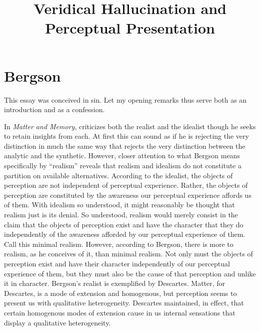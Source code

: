 \documentclass[12pt]{article}
\title{Veridical Hallucination and Perceptual Presentation}
\author{\myauthor}
\date{} %
\begin{document}
\maketitle

\setlength{\parindent}{1em}


\section{Bergson} %
\label{sec:bergson}

This essay was conceived in sin. Let my opening remarks thus serve both as an introduction and as a confession.

In \emph{Matter and Memory}, \citet{Bergson:1912pi} criticizes both the realist and the idealist though he seeks to retain insights from each. At first this can sound as if he is rejecting the very distinction in much the same way that \citet{Quine:1951fk} rejects the very distinction between the analytic and the synthetic. However, closer attention to what Bergson means specifically by ``realism'' reveals that realism and idealism do not constitute a partition on available alternatives. According to the idealist, the objects of perception are not independent of perceptual experience. Rather, the objects of perception are constituted by the awareness our perceptual experience affords us of them. With idealism so understood, it might reasonably be thought that realism just is its denial. So understood, realism would merely consist in the claim that the objects of perception exist and have the character that they do independently of the awareness afforded by our perceptual experience of them. Call this minimal realism. However, according to Bergson, there is more to realism, as he conceives of it, than minimal realism. Not only must the objects of perception exist and have their character independently of our perceptual experience of them, but they must also be the cause of that perception and unlike it in character. Bergson's realist is exemplified by Descartes. Matter, for Descartes, is a mode of extension and homogenous, but perception seems to present us with qualitative heterogeneity. Descartes maintained, in effect, that certain homogenous modes of extension cause in us internal sensations that display a qualitative heterogeneity. 
\end{document}

